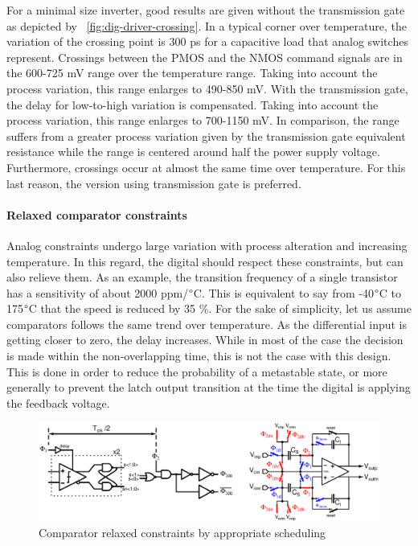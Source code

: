 For a minimal size inverter, good results are given without the transmission gate as depicted by \figurename~\ref{fig:dig-driver-crossing}. In a typical corner over temperature, the variation of the crossing point is 300 ps for a capacitive load that analog switches represent. Crossings between the PMOS and the NMOS command signals are in the 600-725 mV range over the temperature range. Taking into account the process variation, this range enlarges to 490-850 mV. With the transmission gate, the delay for low-to-high variation is compensated. Taking into account the process variation, this range enlarges to 700-1150 mV. In comparison, the range suffers from a greater process variation given by the transmission gate equivalent resistance while the range is centered around half the power supply voltage. Furthermore, crossings occur at almost the same time over temperature. For this last reason, the version using transmission gate is preferred.
\paragraph{Relaxed comparator constraints}

Analog constraints undergo large variation with process alteration and increasing temperature. In this regard, the digital should respect these constraints, but can also relieve them. As an example, the transition frequency of a single transistor has a sensitivity of about 2000 ppm/\(\degree \)C. This is equivalent to say from -40\(\degree \)C to 175\(\degree \)C that the speed is reduced by 35 \%. For the sake of simplicity, let us assume comparators follows the same trend over temperature. As the differential input is getting closer to zero, the delay increases. While in most of the case the decision is made within the non-overlapping time, this is not the case with this design. This is done in order to reduce the probability of a metastable state, or more generally to prevent the latch output transition at the time the digital is applying the feedback voltage.
\begin{figure}[htp]
	\centering
	\includegraphics[width=\textwidth]{Chapter4/Figs/comp-timing-isd.ps}
	\caption{Comparator relaxed constraints by appropriate scheduling}
	\label{fig:comp-timing}
\end{figure}

